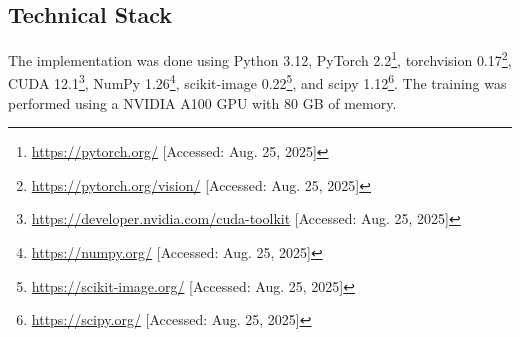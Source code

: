 \documentclass{article}
\begin{document}
\subsection{Technical Stack}

The implementation was done using Python 3.12, PyTorch 2.2\footnote{\url{https://pytorch.org/} [Accessed: Aug. 25, 2025]}, torchvision 0.17\footnote{\url{https://pytorch.org/vision/} [Accessed: Aug. 25, 2025]}, CUDA 12.1\footnote{\url{https://developer.nvidia.com/cuda-toolkit} [Accessed: Aug. 25, 2025]}, NumPy 1.26\footnote{\url{https://numpy.org/} [Accessed: Aug. 25, 2025]}, scikit-image 0.22\footnote{\url{https://scikit-image.org/} [Accessed: Aug. 25, 2025]}, and scipy 1.12\footnote{\url{https://scipy.org/} [Accessed: Aug. 25, 2025]}.
The training was performed using a NVIDIA A100 GPU with 80 GB of memory.




\printbibliography[title={\refname},heading=bibintoc]
\end{document}
